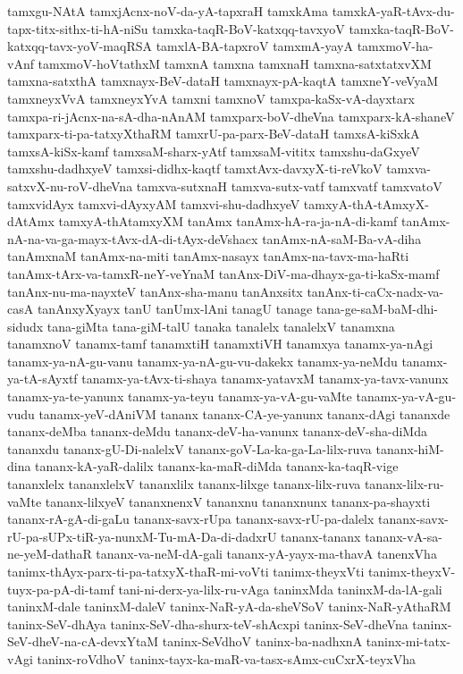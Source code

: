 {tamxgu-NAtA
tamxjAcnx-noV-da-yA-tapxraH
tamxkAma
tamxkA-yaR-tAvx-du-tapx-titx-sithx-ti-hA-niSu
tamxka-taqR-BoV-katxqq-tavxyoV
tamxka-taqR-BoV-katxqq-tavx-yoV-maqRSA
tamxlA-BA-tapxroV
tamxmA-yayA
tamxmoV-ha-vAnf
tamxmoV-hoVtathxM
tamxnA
tamxna
tamxnaH
tamxna-satxtatxvXM
tamxna-satxthA
tamxnayx-BeV-dataH
tamxnayx-pA-kaqtA
tamxneY-veVyaM
tamxneyxVvA
tamxneyxYvA
tamxni
tamxnoV
tamxpa-kaSx-vA-dayxtarx
tamxpa-ri-jAcnx-na-sA-dha-nAnAM
tamxparx-boV-dheVna
tamxparx-kA-shaneV
tamxparx-ti-pa-tatxyXthaRM
tamxrU-pa-parx-BeV-dataH
tamxsA-kiSxkA
tamxsA-kiSx-kamf
tamxsaM-sharx-yAtf
tamxsaM-vititx
tamxshu-daGxyeV
tamxshu-dadhxyeV
tamxsi-didhx-kaqtf
tamxtAvx-davxyX-ti-reVkoV
tamxva-satxvX-nu-roV-dheVna
tamxva-sutxnaH
tamxva-sutx-vatf
tamxvatf
tamxvatoV
tamxvidAyx
tamxvi-dAyxyAM
tamxvi-shu-dadhxyeV
tamxyA-thA-tAmxyX-dAtAmx
tamxyA-thAtamxyXM
tanAmx
tanAmx-hA-ra-ja-nA-di-kamf
tanAmx-nA-na-va-ga-mayx-tAvx-dA-di-tAyx-deVshacx
tanAmx-nA-saM-Ba-vA-diha
tanAmxnaM
tanAmx-na-miti
tanAmx-nasayx
tanAmx-na-tavx-ma-haRti
tanAmx-tArx-va-tamxR-neY-veYnaM
tanAnx-DiV-ma-dhayx-ga-ti-kaSx-mamf
tanAnx-nu-ma-nayxteV
tanAnx-sha-manu
tanAnxsitx
tanAnx-ti-caCx-nadx-va-casA
tanAnxyXyayx
tanU
tanUmx-lAni
tanagU
tanage
tana-ge-saM-baM-dhi-sidudx
tana-giMta
tana-giM-talU
tanaka
tanalelx
tanalelxV
tanamxna
tanamxnoV
tanamx-tamf
tanamxtiH
tanamxtiVH
tanamxya
tanamx-ya-nAgi
tanamx-ya-nA-gu-vanu
tanamx-ya-nA-gu-vu-dakekx
tanamx-ya-neMdu
tanamx-ya-tA-sAyxtf
tanamx-ya-tAvx-ti-shaya
tanamx-yatavxM
tanamx-ya-tavx-vanunx
tanamx-ya-te-yanunx
tanamx-ya-teyu
tanamx-ya-vA-gu-vaMte
tanamx-ya-vA-gu-vudu
tanamx-yeV-dAniVM
tananx
tananx-CA-ye-yanunx
tananx-dAgi
tananxde
tananx-deMba
tananx-deMdu
tananx-deV-ha-vanunx
tananx-deV-sha-diMda
tananxdu
tananx-gU-Di-nalelxV
tananx-goV-La-ka-ga-La-lilx-ruva
tananx-hiM-dina
tananx-kA-yaR-dalilx
tananx-ka-maR-diMda
tananx-ka-taqR-vige
tananxlelx
tananxlelxV
tananxlilx
tananx-lilxge
tananx-lilx-ruva
tananx-lilx-ru-vaMte
tananx-lilxyeV
tananxnenxV
tananxnu
tananxnunx
tananx-pa-shayxti
tananx-rA-gA-di-gaLu
tananx-savx-rUpa
tananx-savx-rU-pa-dalelx
tananx-savx-rU-pa-sUPx-tiR-ya-nunxM-Tu-mA-Da-di-dadxrU
tananx-tananx
tananx-vA-sa-ne-yeM-dathaR
tananx-va-neM-dA-gali
tananx-yA-yayx-ma-thavA
tanenxVha
tanimx-thAyx-parx-ti-pa-tatxyX-thaR-mi-voVti
tanimx-theyxVti
tanimx-theyxV-tuyx-pa-pA-di-tamf
tani-ni-derx-ya-lilx-ru-vAga
taninxMda
taninxM-da-lA-gali
taninxM-dale
taninxM-daleV
taninx-NaR-yA-da-sheVSoV
taninx-NaR-yAthaRM
taninx-SeV-dhAya
taninx-SeV-dha-shurx-teV-shAcxpi
taninx-SeV-dheVna
taninx-SeV-dheV-na-cA-devxYtaM
taninx-SeVdhoV
taninx-ba-nadhxnA
taninx-mi-tatx-vAgi
taninx-roVdhoV
taninx-tayx-ka-maR-va-tasx-sAmx-cuCxrX-teyxVha
}
